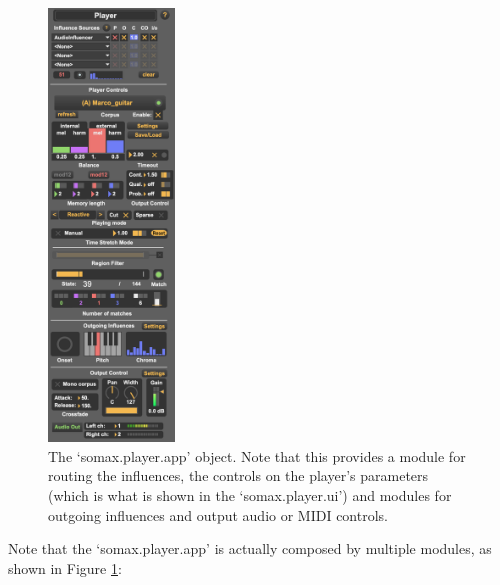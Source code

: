  \begin{figure}[H]
    \centering        
 	\includegraphics[width=0.3\textwidth, keepaspectratio]{img/player_app.png}
    \caption{The `somax.player.app' object. Note that this provides a module for routing the influences, the controls on the player's parameters (which is what is shown in the `somax.player.ui') and modules for outgoing influences and output audio or MIDI controls.}
    \label{fig:player_app}
\end{figure}

Note that the `somax.player.app' is actually composed by multiple modules, as shown in Figure \ref{fig:player_app}:

